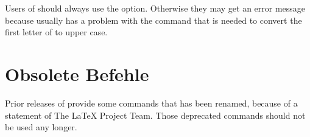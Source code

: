 Users of  should always use the  option.
Otherwise they may get an error message because  usually has
a problem with the  command that
is needed to convert the first letter of  to upper case.%
\EndIndexGroup

 
\section{Obsolete Befehle}

Prior releases of  provide some commands that has been
renamed, because of a statement of The \LaTeX{} Project Team. Those deprecated
commands should not be used any longer.

%
% 
\EndIndexGroup
%
\endinput



